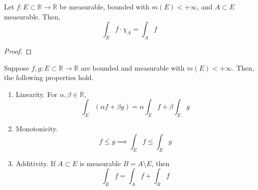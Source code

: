   \begin{lemma}[]
    Let $f: E \subset \mathbb{R} \to \mathbb{R}$ be measurable, bounded with $m(E) < +\infty$, and $A \subset E$ measurable. Then, 
    \begin{equation}
      \int_E f \cdot \chi_A = \int_A f
    \end{equation}
  \end{lemma}
  \begin{proof}
    
  \end{proof}

  \begin{theorem}
    Suppose $f, g: E \subset \mathbb{R} \to \mathbb{R}$ are bounded and measurable with $m(E) < +\infty$. Then, the following properties hold. 
    \begin{enumerate}
      \item Linearity. For $\alpha, \beta \in \mathbb{R}$, 
        \begin{equation}
          \int_E (\alpha f + \beta g) = \alpha \int_E f + \beta \int_E g
        \end{equation} 

      \item Monotonicity. 
        \begin{equation}
          f \leq g \implies \int_E f \leq \int_E g
        \end{equation}

      \item Additivity. If $A \subset E$ is measurable $B = A \setminus E$, then 
        \begin{equation}
          \int_E f  = \int_A f + \int_B f
        \end{equation}
    \end{enumerate}
  \end{theorem}
